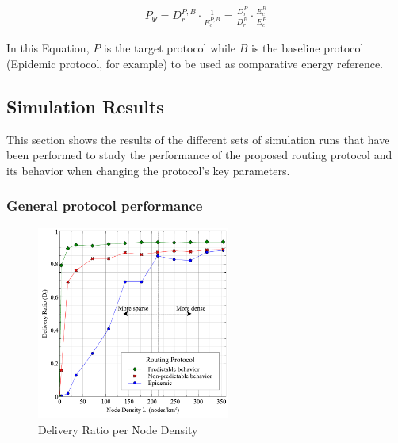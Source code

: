 \documentclass[conference]{IEEEtran}
\begin{document}
\begin{eqnarray}
\label{eq:protocol_performance}
{ P }_{ \Psi }= {{ D }_{ r }^{ P,B }} \cdot \frac { 1 }{ { E }_{c}^{ P,B } } 
= \frac {{ D }_{ r }^{ P }}{{ D }_{ r }^{ B } } \cdot \frac{{ E }_{c}^{ B }}{{ E }_{c}^{ P }}
\end{eqnarray}

In this Equation, $P$ is the target protocol while $B$ is the baseline protocol (Epidemic protocol, for example) to be used as comparative energy reference.

\subsection{Simulation Results}


This section shows the results of the different sets of simulation runs that have been performed to study the performance of the proposed routing protocol and its behavior when changing the protocol's key parameters.

\subsubsection{General protocol performance}

\begin{figure}[!t]
	\centering
	\includegraphics[width=2.5in]{Graphs/DeliveryRatio.pdf}
	\caption{Delivery Ratio per Node Density}
	\label{Delivery Ratio per Node Density}
\end{figure}
\end{document}
